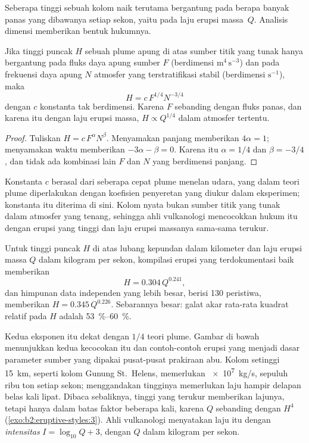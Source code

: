 Seberapa tinggi sebuah kolom naik terutama bergantung pada berapa banyak panas yang dibawanya setiap
sekon, yaitu pada laju erupsi massa~$Q$. Analisis dimensi memberikan
bentuk hukumnya.

\begin{proposition}\label{prop:b2:eruptive-styles:plume}
Jika tinggi puncak $H$ sebuah plume apung di atas sumber titik yang tunak hanya bergantung
pada fluks daya apung sumber $F$ (berdimensi $\mathrm{m^4\,s^{-3}}$) dan pada
frekuensi daya apung $N$ atmosfer yang terstratifikasi stabil (berdimensi
$\mathrm{s^{-1}}$), maka
\[
H = c\,F^{1/4}N^{-3/4}
\]
dengan $c$ konstanta tak berdimensi. Karena $F$ sebanding dengan fluks panas, dan karena itu
dengan laju erupsi massa, $H \propto Q^{1/4}$ dalam atmosfer tertentu.
\end{proposition}

\begin{proof}
Tuliskan $H = c\,F^{\alpha}N^{\beta}$. Menyamakan panjang memberikan $4\alpha = 1$; menyamakan
waktu memberikan $-3\alpha - \beta = 0$. Karena itu $\alpha = 1/4$ dan $\beta = -3/4$, dan tidak ada
kombinasi lain $F$ dan $N$ yang berdimensi panjang.
\end{proof}

Konstanta $c$ berasal dari seberapa cepat plume menelan udara, yang dalam teori plume
diperlakukan dengan koefisien penyeretan yang diukur dalam eksperimen; konstanta itu diterima
di sini. Kolom nyata bukan sumber titik yang tunak dalam atmosfer yang tenang, sehingga
ahli vulkanologi mencocokkan hukum itu dengan erupsi yang tinggi dan laju erupsi massanya
sama-sama terukur.

\begin{proposition}\label{prop:b2:eruptive-styles:mastin}
Untuk tinggi puncak $H$ di atas lubang kepundan dalam kilometer dan laju erupsi massa
$Q$ dalam kilogram per sekon, kompilasi erupsi yang terdokumentasi baik memberikan
\[
H = 0.304\,Q^{0.241},
\]
dan himpunan data independen yang lebih besar, berisi 130 peristiwa, memberikan $H = 0.345\,Q^{0.226}$.
Sebarannya besar: galat akar rata-rata kuadrat relatif pada $H$ adalah
\qtyrange{53}{60}{\percent}.
\end{proposition}
\admitted

Kedua eksponen itu dekat dengan $1/4$ teori plume. Gambar di bawah menunjukkan
kedua kecocokan itu dan contoh-contoh erupsi yang menjadi dasar parameter sumber yang dipakai
pusat-pusat prakiraan abu. Kolom setinggi \qty{15}{km}, seperti kolom Gunung
St.~Helens, memerlukan \qty{e7}{kg/s}, sepuluh ribu ton setiap sekon; menggandakan
tingginya memerlukan laju hampir delapan belas kali lipat. Dibaca sebaliknya, tinggi yang terukur memberikan
lajunya, tetapi hanya dalam batas faktor beberapa kali, karena $Q$ sebanding dengan $H^4$
(\cref{exo:b2:eruptive-styles:3}). Ahli vulkanologi menyatakan laju itu dengan \emph{intensitas} $I =
\log_{10}Q + 3$, dengan $Q$ dalam kilogram per sekon.

